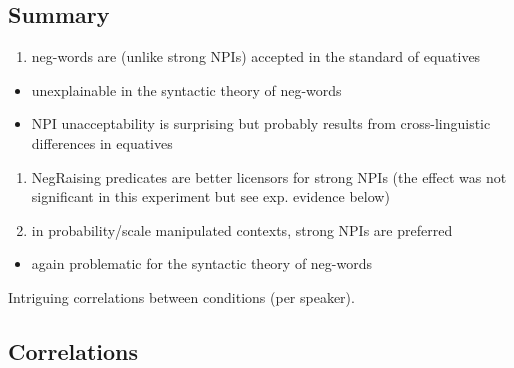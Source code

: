 \documentclass[
  letterpaper,
  DIV=11,
  numbers=noendperiod]{scrartcl}
\providecommand{\tightlist}{%
  \setlength{\itemsep}{0pt}\setlength{\parskip}{0pt}}\usepackage{longtable,booktabs,array}
\begin{document}
\hypertarget{summary}{%
\subsection{Summary}\label{summary}}

\begin{enumerate}
\def\labelenumi{\arabic{enumi}.}
\tightlist
\item
  neg-words are (unlike strong NPIs) accepted in the standard of
  equatives
\end{enumerate}

\begin{itemize}
\tightlist
\item
  unexplainable in the syntactic theory of neg-words
\item
  NPI unacceptability is surprising but probably results from
  cross-linguistic differences in equatives
\end{itemize}

\begin{enumerate}
\def\labelenumi{\arabic{enumi}.}
\setcounter{enumi}{1}
\item
  NegRaising predicates are better licensors for strong NPIs (the effect
  was not significant in this experiment but see exp. evidence below)
\item
  in probability/scale manipulated contexts, strong NPIs are preferred
\end{enumerate}

\begin{itemize}
\tightlist
\item
  again problematic for the syntactic theory of neg-words
\end{itemize}

Intriguing correlations between conditions (per speaker).

\hypertarget{correlations}{%
\subsection{Correlations}\label{correlations}}
\end{document}

